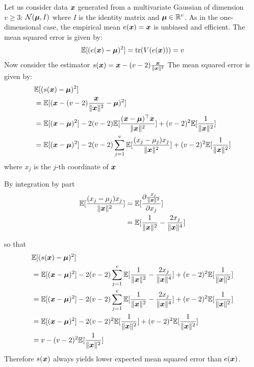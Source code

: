 \begin{example}
  \label{ex:stein}
  Let us consider data $\xb$ generated from a multivariate Gaussian
  of dimension $v \geq 3$:
  $\Ncal(\mub, I)$ where $I$ is the identity matrix and $\mub \in \RR^v$.
  As in the one-dimensional case, the empirical mean $e(\xb) =\xb$ is unbiased and efficient.
  The mean squared error is given by:
  \begin{align}
    \EE[(e(\xb) - \mub)^2] = \tr(V(e(\xb))) = v
  \end{align}
  Now consider the estimator $s(\xb) = \xb - (v-2) \frac{\xb}{\|\xb\|^2}$
  The mean squared error is given by:
  \begin{align}
    &\EE[(s(\xb) - \mub)^2] \\ &= \EE[(\xb - (v-2) \frac{\xb}{\|\xb\|^2} - \mub)^2] \\
                        &= \EE[(\xb - \mub)^2] -2 (v-2)\EE[\frac{(\xb - \mub)^{\top}\xb}{\|\xb\|^2}] + (v-2)^2 \EE[\frac1{\| \xb \|^2}] \\
                            &= \EE[(\xb - \mub)^2] -2 (v-2) \sum_{j=1}^v \EE[\frac{(x_j - \mu_j)x_j}{\|\xb\|^2}] + (v-2)^2 \EE[\frac1{\| \xb \|^2}]
  \end{align}
  where $x_j$ is the $j$-th coordinate of $\xb$

  By integration by part 
  \begin{align}
    \EE[\frac{(x_j - \mu_j)x_j}{\|\xb\|^2}] &= \EE[\partialfrac{x_j}{\frac{x_j}{\|\xb\|^2}}]  \\
    &= \EE[\frac1{\|\xb\|^2} - \frac{2x_j}{\|\xb\|^4}]
  \end{align}

  so that 
  \begin{align}
    &\EE[(s(\xb) - \mub)^2] \\
    &= \EE[(\xb - \mub)^2] -2 (v-2) \sum_{j=1}^v \EE[\frac1{\|\xb\|^2} - \frac{2x_j}{\|\xb\|^4}] + (v-2)^2 \EE[\frac1{\| \xb \|^2}] \\
    &= \EE[(\xb - \mub)^2] -2 (v-2) \sum_{j=1}^v \EE[\frac1{\|\xb\|^2} - \frac{2x_j}{\|\xb\|^4}] + (v-2)^2 \EE[\frac1{\| \xb \|^2}] \\
    &= \EE[(\xb - \mub)^2] -2 (v-2)^2 \EE[\frac1{\|\xb\|^2}] + (v-2)^2 \EE[\frac1{\| \xb \|^2}] \\
    &= v - (v-2)^2 \EE[\frac1{\|\xb\|^2}]
 \end{align}
 Therefore $s(\xb)$ always yields lower expected mean squared error than
 $e(\xb)$.
\end{example}

